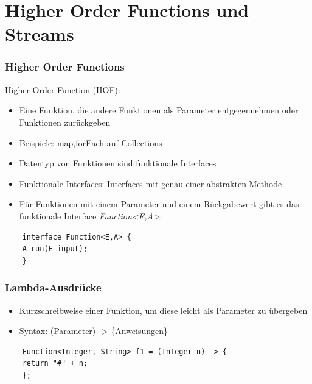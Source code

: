 \section{Higher Order Functions und Streams}

\begin{frame}[fragile]
\frametitle{Higher Order Functions}
Higher Order Function (HOF):
\begin{itemize}
    \item Eine Funktion, die andere Funktionen als Parameter entgegennehmen oder Funktionen zurückgeben
    \item Beispiele: map,forEach auf Collections
    \item Datentyp von Funktionen sind funktionale Interfaces
    \item Funktionale Interfaces: Interfaces mit genau einer abstrakten Methode
    \item Für Funktionen mit einem Parameter und einem Rückgabewert gibt es das funktionale Interface \textit{Function<E,A>}:
\end{itemize}

\begin{lstlisting}
    interface Function<E,A> {
    A run(E input);
    }
\end{lstlisting}
\end{frame}

\begin{frame}[fragile]
\frametitle{Lambda-Ausdrücke}
\begin{itemize}
    \item Kurzschreibweise einer Funktion, um diese leicht als Parameter zu übergeben
    \item Syntax: (Parameter) -> \{Anweisungen\}
\end{itemize}

\begin{lstlisting}
    Function<Integer, String> f1 = (Integer n) -> {
    return "#" + n;
    };
\end{lstlisting}
\end{frame}

